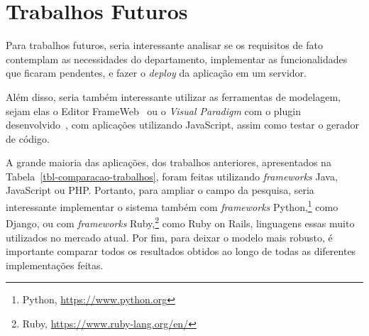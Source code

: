 

\section{Trabalhos Futuros}
\label{sec-conclusoes-trabalhosfuturos}


Para trabalhos futuros, seria interessante analisar se os requisitos de fato contemplam as necessidades do departamento,
implementar as funcionalidades que ficaram pendentes, e fazer o \textit{deploy} da aplicação em um servidor.

Além disso, seria também interessante utilizar as ferramentas de modelagem, sejam elas o Editor FrameWeb~\cite{campos:2017} ou o \textit{Visual Paradigm} com o plugin desenvolvido~\cite{silva:2023},
com aplicações utilizando JavaScript, assim como testar o gerador de código.

A grande maioria das aplicações, dos trabalhos anteriores, apresentados na Tabela~\ref*{tbl-comparacao-trabalhos}, foram feitas utilizando \textit{frameworks} Java, JavaScript ou PHP. Portanto, para ampliar
o campo da pesquisa, seria interessante
implementar o sistema também com \textit{frameworks} Python,\footnote{Python, \url{https://www.python.org}} como Django, ou com \textit{frameworks} Ruby,\footnote{Ruby, \url{https://www.ruby-lang.org/en/}} como Ruby on Rails,
linguagens essas muito utilizados no mercado atual.
Por fim, para deixar o modelo mais robusto, é importante comparar todos os resultados obtidos ao longo de todas as diferentes implementações feitas.



